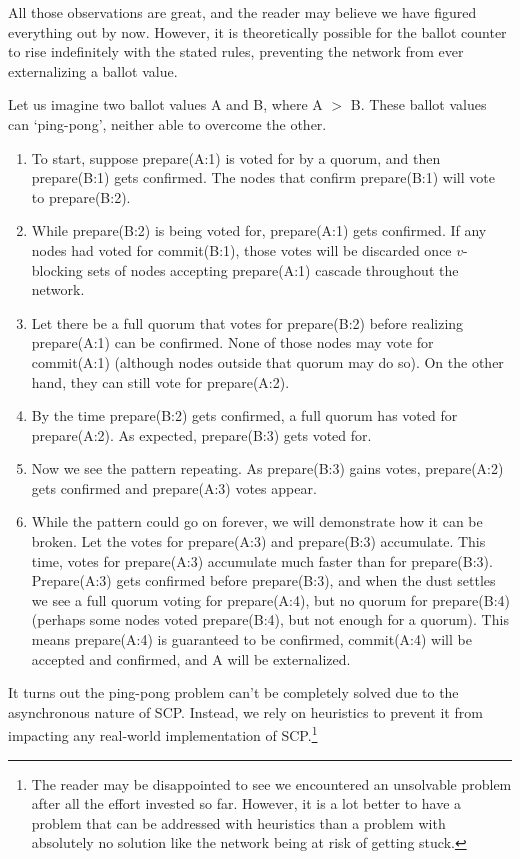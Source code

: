 All those observations are great, and the reader may believe we have figured everything out by now. However, it is theoretically possible for the ballot counter to rise indefinitely with the stated rules, preventing the network from ever externalizing a ballot value.

Let us imagine two ballot values A and B, where A $>$ B. These ballot values can `ping-pong', neither able to overcome the other.

\begin{enumerate}
    \item To start, suppose prepare(A:1) is voted for by a quorum, and then prepare(B:1) gets confirmed. The nodes that confirm prepare(B:1) will vote to prepare(B:2).

    \item While prepare(B:2) is being voted for, prepare(A:1) gets confirmed. If any nodes had voted for commit(B:1), those votes will be discarded once $v$-blocking sets of nodes accepting prepare(A:1) cascade throughout the network.

    \item Let there be a full quorum that votes for prepare(B:2) before realizing prepare(A:1) can be confirmed. None of those nodes may vote for commit(A:1) (although nodes outside that quorum may do so). On the other hand, they can still vote for prepare(A:2).

    \item By the time prepare(B:2) gets confirmed, a full quorum has voted for prepare(A:2). As expected, prepare(B:3) gets voted for.

    \item Now we see the pattern repeating. As prepare(B:3) gains votes, prepare(A:2) gets confirmed and prepare(A:3) votes appear.

    \item While the pattern could go on forever, we will demonstrate how it can be broken. Let the votes for prepare(A:3) and prepare(B:3) accumulate. This time, votes for prepare(A:3) accumulate much faster than for prepare(B:3). Prepare(A:3) gets confirmed before prepare(B:3), and when the dust settles we see a full quorum voting for prepare(A:4), but no quorum for prepare(B:4) (perhaps some nodes voted prepare(B:4), but not enough for a quorum). This means prepare(A:4) is guaranteed to be confirmed, commit(A:4) will be accepted and confirmed, and A will be externalized.
\end{enumerate}

It turns out the ping-pong problem can't be completely solved due to the asynchronous nature of SCP. Instead, we rely on heuristics to prevent it from impacting any real-world implementation of SCP.\footnote{The reader may be disappointed to see we encountered an unsolvable problem after all the effort invested so far. However, it is a lot better to have a problem that can be addressed with heuristics than a problem with absolutely no solution like the network being at risk of getting stuck.}

